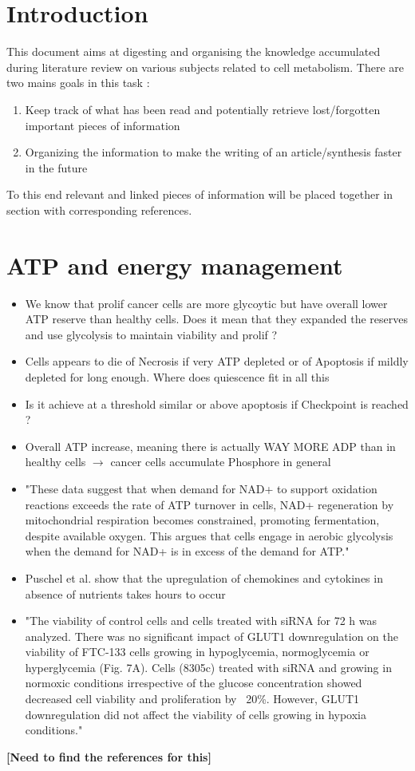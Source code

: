 \documentclass[11pt,a4paper]{article}
\begin{document}
\tableofcontents

\section{Introduction}
This document aims at digesting and organising the knowledge accumulated during literature review on various subjects related to cell metabolism. There are two mains goals in this task : 
\begin{enumerate}
\item Keep track of what has been read and potentially retrieve lost/forgotten important pieces of information
\item Organizing the information to make the writing of an article/synthesis faster in the future
\end{enumerate}
To this end relevant and linked pieces of information will be placed together in section with corresponding references.


\section{ATP and energy management}
\begin{itemize}
\item We know that prolif cancer cells are more glycoytic but have overall lower ATP reserve than healthy cells. Does it mean that they expanded the reserves and use glycolysis to maintain viability and prolif ? 
\item Cells appears to die of Necrosis if very ATP depleted or of Apoptosis if mildly depleted for long enough.  Where does quiescence fit in all this 
\item Is it achieve at a threshold similar or above apoptosis if Checkpoint is reached ? 
\item Overall ATP increase, meaning there is actually WAY MORE ADP than in healthy cells $\rightarrow$ cancer cells accumulate Phosphore in general
\item "These data suggest that when demand for NAD+ to support oxidation reactions exceeds the rate of ATP turnover in cells, NAD+ regeneration by mitochondrial respiration becomes constrained, promoting fermentation, despite available oxygen. This argues that cells engage in aerobic glycolysis when the demand for NAD+ is in excess of the demand for ATP."\cite{Luengo2020}
\item Puschel et al. show that the upregulation of chemokines and cytokines in absence of nutrients takes hours to occur \cite{Puschel}
\item "The viability of control cells and cells treated with siRNA for 72 h was analyzed. There was no significant impact of GLUT1 downregulation on the viability of FTC-133 cells growing in hypoglycemia, normoglycemia or hyperglycemia (Fig. 7A). Cells (8305c) treated with siRNA and growing in normoxic conditions irrespective of the glucose concentration showed decreased cell viability and proliferation by ~20\%. However, GLUT1 downregulation did not affect the viability of cells growing in hypoxia conditions."\cite{Jozwiak2014}
\end{itemize}
\textbf{[Need to find the references for this]}
\end{document}
